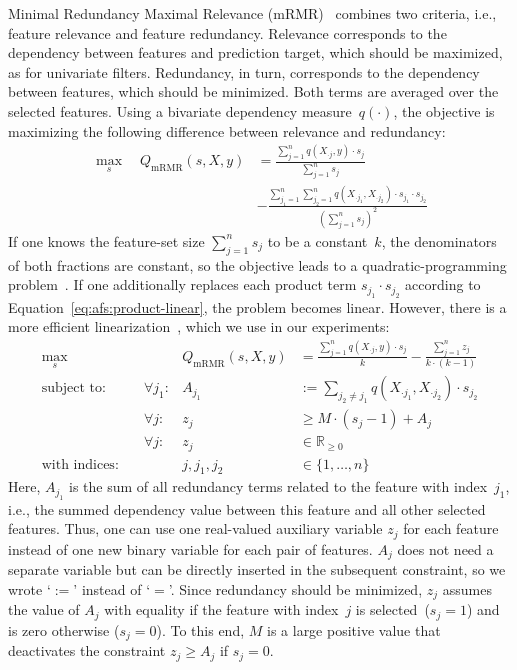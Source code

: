 \documentclass{article}
\theoremstyle{definition}
\begin{document}
Minimal Redundancy Maximal Relevance (mRMR)~\cite{peng2005feature} combines two criteria, i.e., feature relevance and feature redundancy.
Relevance corresponds to the dependency between features and prediction target, which should be maximized, as for univariate filters.
Redundancy, in turn, corresponds to the dependency between features, which should be minimized.
Both terms are averaged over the selected features.
Using a bivariate dependency measure~$q(\cdot)$, the objective is maximizing the following difference between relevance and redundancy:
%
\begin{equation}
	\begin{aligned}
		\max_s \quad Q_{\text{mRMR}}(s,X,y) &= \frac{\sum_{j=1}^{n} q(X_{\cdot{}j},y) \cdot s_j}{\sum_{j=1}^{n} s_j} \\
		&- \frac{\sum_{j_1=1}^{n} \sum_{j_2=1}^{n} q(X_{\cdot{}j_1}, X_{\cdot{}j_2}) \cdot s_{j_1} \cdot s_{j_2}}{(\sum_{j=1}^{n} s_j)^2}
	\end{aligned}
	\label{eq:afs:mrmr}
\end{equation}
%
If one knows the feature-set size $\sum_{j=1}^{n} s_j$ to be a constant~$k$, the denominators of both fractions are constant, so the objective leads to a quadratic-programming problem~\cite{nguyen2014effective, rodriguez2010quadratic}.
If one additionally replaces each product term $s_{j_1} \cdot s_{j_2}$ according to Equation~\ref{eq:afs:product-linear}, the problem becomes linear.
However, there is a more efficient linearization~\cite{nguyen2009optimizing, nguyen2010towards}, which we use in our experiments:
%
\begin{equation}
	\begin{aligned}
		\max_s &\quad & Q_{\text{mRMR}}(s,X,y) &= \frac{\sum_{j=1}^{n} q(X_{\cdot{}j},y) \cdot s_j}{k} - \frac{\sum_{j=1}^{n} z_j}{k \cdot (k-1)} \\
		\text{subject to:} &\quad \forall j_1: & A_{j_1} &:= \sum_{j_2 \neq j_1} q(X_{\cdot{}j_1}, X_{\cdot{}j_2}) \cdot s_{j_2} \\
		&\quad \forall j: & z_j &\geq M \cdot (s_j - 1) + A_j \\
		&\quad \forall j: & z_j &\in \mathbb{R}_{\geq 0} \\
		\text{with indices:} &\quad & j, j_1, j_2 &\in \{1, \dots, n\}
	\end{aligned}
	\label{eq:afs:mrmr-linear}
\end{equation}
%
Here, $A_{j_1}$ is the sum of all redundancy terms related to the feature with index~$j_1$, i.e., the summed dependency value between this feature and all other selected features.
Thus, one can use one real-valued auxiliary variable $z_j$ for each feature instead of one new binary variable for each pair of features.
$A_j$ does not need a separate variable but can be directly inserted in the subsequent constraint, so we wrote `$:=$' instead of `$=$'.
Since redundancy should be minimized, $z_j$ assumes the value of $A_j$ with equality if the feature with index~$j$ is selected~($s_j=1$) and is zero otherwise ($s_j=0$).
To this end, $M$ is a large positive value that deactivates the constraint $z_j \geq A_j$ if $s_j=0$.
\end{document}
